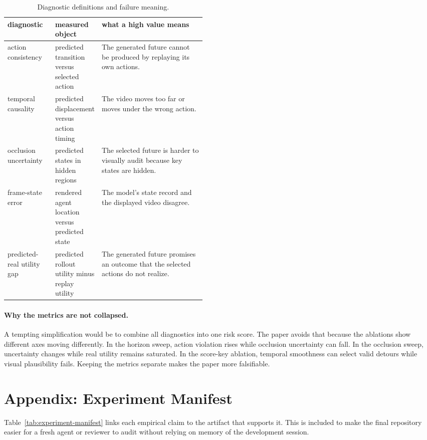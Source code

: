 \documentclass{article}
\begin{document}
\begin{table}[tbp]
  \centering
  \small
  \caption{Diagnostic definitions and failure meaning.}
  \label{tab:metric-definitions}
  \begin{tabularx}{\linewidth}{@{}p{0.24\linewidth}p{0.22\linewidth}X@{}}
    \toprule
    diagnostic & measured object & what a high value means \\
    \midrule
    action consistency & predicted transition versus selected action & The generated future cannot be produced by replaying its own actions. \\
    temporal causality & predicted displacement versus action timing & The video moves too far or moves under the wrong action. \\
    occlusion uncertainty & predicted states in hidden regions & The selected future is harder to visually audit because key states are hidden. \\
    frame-state error & rendered agent location versus predicted state & The model's state record and the displayed video disagree. \\
    predicted-real utility gap & predicted rollout utility minus replay utility & The generated future promises an outcome that the selected actions do not realize. \\
    \bottomrule
  \end{tabularx}
\end{table}

\paragraph{Why the metrics are not collapsed.}
A tempting simplification would be to combine all diagnostics into one risk score. The paper avoids that because the ablations show different axes moving differently. In the horizon sweep, action violation rises while occlusion uncertainty can fall. In the occlusion sweep, uncertainty changes while real utility remains saturated. In the score-key ablation, temporal smoothness can select valid detours while visual plausibility fails. Keeping the metrics separate makes the paper more falsifiable.

\section{Appendix: Experiment Manifest}
\label{app:experiment-manifest}

Table~\ref{tab:experiment-manifest} links each empirical claim to the artifact that supports it. This is included to make the final repository easier for a fresh agent or reviewer to audit without relying on memory of the development session.
\end{document}
